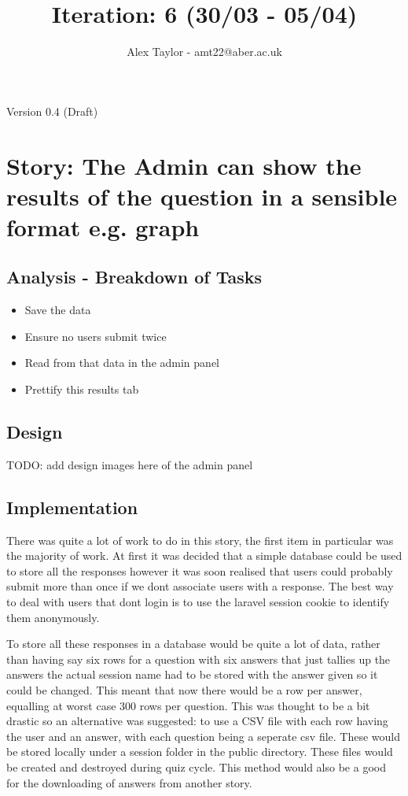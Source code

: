 \documentclass{article}
\title{Iteration: 6 (30/03 - 05/04)}
\author{Alex Taylor - amt22@aber.ac.uk}
\begin{document}
\maketitle
\begin{center}
	Version 0.4 (Draft)
\end{center}
\tableofcontents
\thispagestyle{empty}
\newpage

\section{Story: The Admin can show the results of the question in a sensible format e.g. graph}
\subsection{Analysis - Breakdown of Tasks}
\begin{itemize}
	\item Save the data
	\item Ensure no users submit twice
	\item Read from that data in the admin panel
	\item Prettify this results tab
\end{itemize}
\subsection{Design}
TODO: add design images here of the admin panel
\subsection{Implementation}
There was quite a lot of work to do in this story, the first item in particular was the majority of work. At first it was decided that a simple database could be used to store all the responses however it was soon realised that users could probably submit more than once if we dont associate users with a response. The best way to deal with users that dont login is to use the laravel session cookie to identify them anonymously.

To store all these responses in a database would be quite a lot of data, rather than having say six rows for a question with six answers that just tallies up the answers the actual session name had to be stored with the answer given so it could be changed. This meant that now there would be a row per answer, equalling at worst case 300 rows per question. This was thought to be a bit drastic so an alternative was suggested: to use a CSV file with each row having the user and an answer, with each question being a seperate csv file. These would be stored locally under a session folder in the public directory. These files would be created and destroyed during quiz cycle. This method would also be a good for the downloading of answers from another story. 
\end{document}
